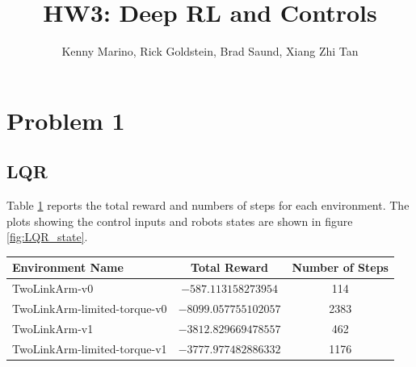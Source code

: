 \documentclass[hidelinks]{scrartcl}
\title{HW3: Deep RL and Controls}
\author{Kenny Marino, Rick Goldstein, Brad Saund, Xiang Zhi Tan}
\begin{document}
\maketitle

\section*{Problem 1}
\subsection*{LQR}
Table \ref{table:LQR_performance} reports the total reward and numbers of steps for each environment. The plots showing the control inputs and robots states are shown in figure \ref{fig:LQR_state}. 

\begin{table}[h]
	\centering
	\begin{tabular}{|l|c|c|}
		\hline	
		Environment Name & Total Reward & Number of Steps\\
		\hline
		TwoLinkArm-v0 & $-587.113158273954$ & 114 \\ 
		TwoLinkArm-limited-torque-v0 & $-8099.057755102057$ & 2383\\
		TwoLinkArm-v1 & $-3812.829669478557$ & 462 \\
		TwoLinkArm-limited-torque-v1 & $-3777.977482886332$ & 1176 \\		
		\hline
	\end{tabular}
	\\
	\label{table:LQR_performance}
\end{table}
\end{document}
